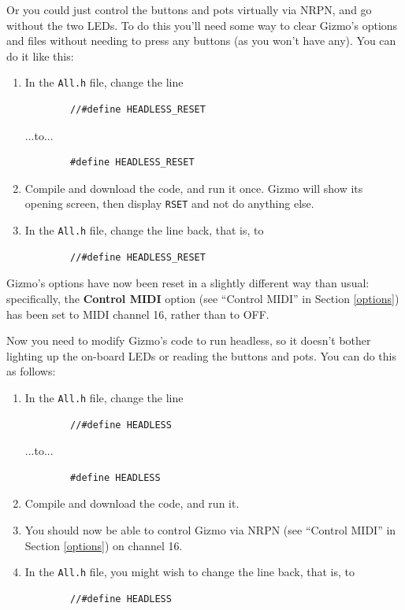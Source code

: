 \documentclass{article}
\begin{document}
Or you could just control the buttons and pots virtually via NRPN, and go without the two LEDs.  To do this you'll need some way to clear Gizmo's options and files without needing to press any buttons (as you won't have any).  You can do it like this:

\begin{enumerate}
\item In the \texttt{All.h} file, change the line 
\begin{verbatim}
        //#define HEADLESS_RESET
\end{verbatim}
...to...
\begin{verbatim}
        #define HEADLESS_RESET
\end{verbatim}
\item Compile and download the code, and run it once.  Gizmo will show its opening screen, then display \texttt{RSET} and not do anything else.
\item In the \texttt{All.h} file, change the line back, that is, to 
\begin{verbatim}
        //#define HEADLESS_RESET
\end{verbatim}

\end{enumerate}

Gizmo's options have now been reset in a slightly different way than usual: specifically, the {\bf Control MIDI} option (see ``Control MIDI'' in Section \ref{options}) has been set to MIDI channel 16, rather than to OFF.

Now you need to modify Gizmo's code to run headless, so it doesn't bother lighting up the on-board LEDs or reading the buttons and pots.   You can do this as follows:

\begin{enumerate}
\item In the \texttt{All.h} file, change the line 
\begin{verbatim}
        //#define HEADLESS
\end{verbatim}
...to...
\begin{verbatim}
        #define HEADLESS
\end{verbatim}
\item Compile and download the code, and run it.
\item You should now be able to control Gizmo via NRPN (see ``Control MIDI'' in Section \ref{options}) on channel 16.
\item In the \texttt{All.h} file, you might wish to change the line back, that is, to 
\begin{verbatim}
        //#define HEADLESS
\end{verbatim}

\end{enumerate}
\end{document}
